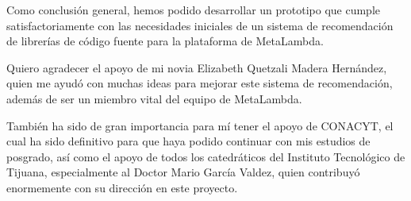 \documentclass[times, 10pt,twocolumn, a4paper]{article}
\begin{document}
Como conclusi\'on general, hemos podido desarrollar un prototipo que
cumple satisfactoriamente con las necesidades iniciales de un sistema
de recomendaci\'on de librer\'ias de c\'odigo fuente para la
plataforma de MetaLambda.


Quiero agradecer el apoyo de mi novia Elizabeth Quetzali Madera
Hern\'andez, quien me ayud\'o con muchas ideas para mejorar este
sistema de recomendaci\'on, adem\'as de ser un miembro vital del
equipo de MetaLambda.

Tambi\'en ha sido de gran importancia para m\'i tener el apoyo de
CONACYT, el cual ha sido definitivo para que haya podido continuar con
mis estudios de posgrado, as\'i como el apoyo de todos los catedr\'aticos del
Instituto Tecnol\'ogico de Tijuana, especialmente al Doctor Mario
Garc\'ia Valdez, quien contribuy\'o enormemente con su direcci\'on en
este proyecto.




\end{document}

